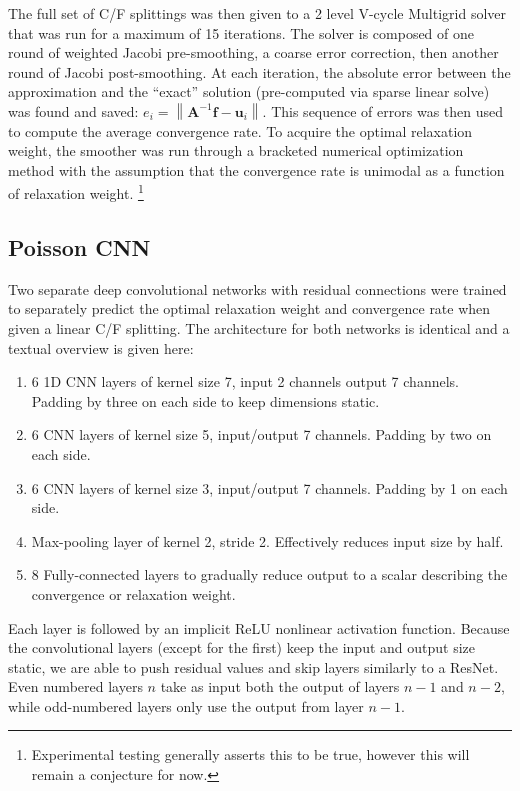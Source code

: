 \documentclass[review]{siamart190516}
\newcommand{\norm}[1]{\left\lVert#1\right\rVert}
\newcommand{\mat}[1]{\bm{{#1}}}
\renewcommand{\vec}[1]{\bm{{#1}}}
\begin{document}
The full set of C/F splittings was then given to a 2 level V-cycle Multigrid solver that was run for a maximum of 15 iterations.  The solver is composed of one round of weighted Jacobi pre-smoothing, a coarse error correction, then another round of Jacobi post-smoothing.  At each iteration, the absolute error between the approximation and the ``exact'' solution (pre-computed via sparse linear solve) was found and saved: $e_i = \norm{\mat{A}^{-1}\vec{f} - \vec{u}_i}$.  This sequence of errors was then used to compute the average convergence rate.  To acquire the optimal relaxation weight, the smoother was run through a bracketed numerical optimization method with the assumption that the convergence rate is unimodal as a function of relaxation weight. \footnote{Experimental testing generally asserts this to be true, however this will remain a conjecture for now.}

\subsection{Poisson CNN}\label{subsec:poisson_cnn}

Two separate deep convolutional networks with residual connections were trained to separately predict the optimal relaxation weight and convergence rate when given a linear C/F splitting.  The architecture for both networks is identical and a textual overview is given here:

\begin{enumerate}
\item 6 1D CNN layers of kernel size 7, input 2 channels output 7 channels.  Padding by three on each side to keep dimensions static.
\item 6 CNN layers of kernel size 5, input/output 7 channels.  Padding by two on each side.
\item 6 CNN layers of kernel size 3, input/output 7 channels.  Padding by 1 on each side.
\item Max-pooling layer of kernel 2, stride 2.  Effectively reduces input size by half.
\item 8 Fully-connected layers to gradually reduce output to a scalar describing the convergence or relaxation weight.
\end{enumerate}

Each layer is followed by an implicit ReLU nonlinear activation function.  Because the convolutional layers (except for the first) keep the input and output size static, we are able to push residual values and skip layers similarly to a ResNet.  Even numbered layers $n$ take as input both the output of layers $n-1$ and $n-2$, while odd-numbered layers only use the output from layer $n-1$.
\end{document}
